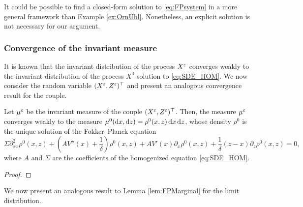 \documentclass[10pt]{article}
\begin{document}
\begin{remark} It could be possible to find a closed-form solution to \eqref{eq:FPsystem} in a more general framework than Example \ref{ex:OrnUhl}. Nonetheless, an explicit solution is not necessary for our argument.
\end{remark}

\subsubsection{Convergence of the invariant measure}\label{sec:convMeasure}

It is known that the invariant distribution of the process $X^\varepsilon$ converges weakly to the invariant distribution of the process $X^0$ solution to \eqref{eq:SDE_HOM}. We now consider the random variable $(X^\varepsilon, Z^\varepsilon)^\top$ and present an analogous convergence result for the couple.

\begin{lemma}\label{lem:convMeasure} Let $\mu^\varepsilon$ be the invariant measure of the couple $(X^\varepsilon, Z^\varepsilon)^\top$. Then, the measure $\mu^\varepsilon$ converges weakly to the measure $\mu^0(\mathrm{d} x, \mathrm{d} z) = \rho^0(x, z) \,\mathrm{d} x \,\mathrm{d} z$, whose density $\rho^0$ is the unique solution of the Fokker--Planck equation
\begin{equation} \label{eq:FPsystem_homogenized}
	\Sigma \partial^2_{xx} \rho^0(x,z) + \left ( A V''(x) + \frac{1}{\delta} \right ) \rho^0(x,z) + A V'(x) \partial_x \rho^0(x,z) + \frac{1}{\delta}(z - x) \partial_z \rho^0(x,z) = 0,
\end{equation}
where $A$ and $\Sigma$ are the coefficients of the homogenized equation \eqref{eq:SDE_HOM}.
\end{lemma}
\begin{proof} 
\end{proof}

We now present an analogous result to Lemma \ref{lem:FPMarginal} for the limit distribution.
\end{document}
